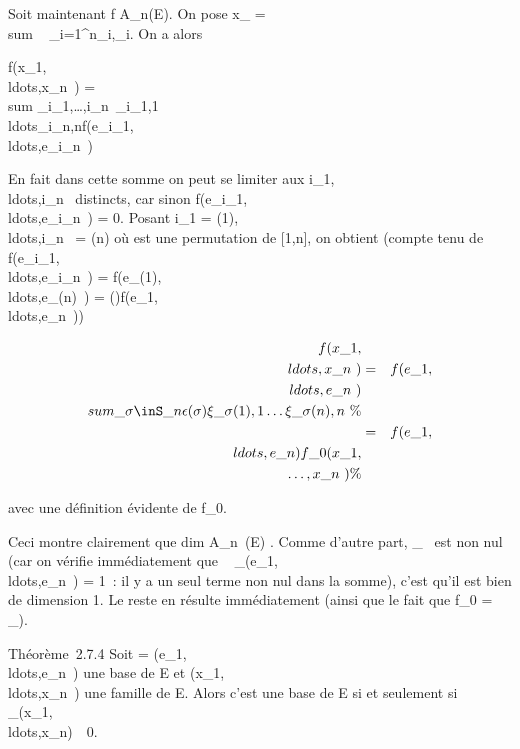 \documentclass[]{article}
\begin{document}
Soit maintenant f \in A\_n(E). On pose x\_\jmath
= \\sum ~
\_i=1^n\xi\_i,\jmathe\_i. On a alors

f(x\_1,\\ldots,x\_n~)
= \\sum
\_i\_1,\ldots,i\_n\in{}~\xi\_i\_1,1\\ldots\xi\_i\_n,nf(e\_i\_1,\\ldots,e\_i\_n~)

En fait dans cette somme on peut se limiter aux
i\_1,\\ldots,i\_n~
distincts, car sinon
f(e\_i\_1,\\ldots,e\_i\_n~)
= 0. Posant i\_1 =
\sigma(1),\\ldots,i\_n~
= \sigma(n) où \sigma est une permutation de {[}1,n{]}, on obtient (compte tenu de
f(e\_i\_1,\\ldots,e\_i\_n~)
=
f(e\_\sigma(1),\\ldots,e\_\sigma(n)~)
=
\epsilon(\sigma)f(e\_1,\\ldots,e\_n~))

\begin{align*}
f(x\_1,\\ldots,x\_n~)&
=&
f(e\_1,\\ldots,e\_n~)\\sum
\_\sigma\inS\_n\epsilon(\sigma)\xi\_\sigma(1),1\ldots\xi\_\sigma(n),n~\%&
\\ & =&
f(e\_1,\\ldots,e\_n)f\_0(x\_1,\\\ldots,x\_n~)
\%& \\ \end{align*}

avec une définition évidente de f\_0.

Ceci montre clairement que dim A\_n~(E)
. Comme d'autre part,
 \_~ est
non nul (car on vérifie immédiatement que
~
\_(e\_1,\\ldots,e\_n~)
= 1~: il y a un seul terme non nul dans la somme), c'est qu'il est bien
de dimension 1. Le reste en résulte immédiatement (ainsi que le fait que
f\_0 = ~
\_).

Théorème~2.7.4 Soit  =
(e\_1,\\ldots,e\_n~)
une base de E et
(x\_1,\\ldots,x\_n~)
une famille de E. Alors c'est une base de E si et seulement si
~
\_(x\_1,\\ldots,x\_n)\mathrel\neq~~0.
\end{document}
